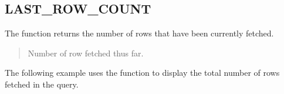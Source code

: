 \documentclass[letterpaper,10pt,english,openany,oneside]{sphinxmanual}
\begin{document}
\newpage


\subsection{LAST\_ROW\_COUNT}
\label{\detokenize{last_row_count::doc}}\label{\detokenize{last_row_count:last-row-count}}
The  function returns the number of rows that have been
currently fetched.
\begin{quote}

\end{quote}


\begin{quote}

Number of row fetched thus far.
\end{quote}


The following example uses the  function to display the
total number of rows fetched in the query.
\end{document}
